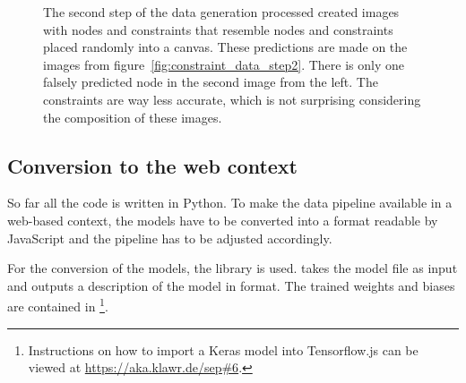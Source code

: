\begin{figure}
\begin{subfigure}[b]{0.19\textwidth}
    \end{subfigure}
    \begin{subfigure}[b]{0.19\textwidth}
    \end{subfigure}
    \caption[Predictions of the first prototype on the generated data]{The second step of the data generation processed created images with nodes and constraints that resemble nodes and constraints placed randomly into a canvas. These predictions are made on the images from figure~\ref{fig:constraint_data_step2}. There is only one falsely predicted node in the second image from the left. The constraints are way less accurate, which is not surprising considering the composition of these images.}\label{fig:constraint_data_step3}
\end{figure}

\subsection{Conversion to the web context}\label{ch:conversion_to_web_context}

So far all the code is written in Python.
To make the data pipeline available in a web-based context, the models have to be converted into a format readable by JavaScript and the pipeline has to be adjusted accordingly.

For the conversion of the models, the library  %
is used.
 takes the model file as input and outputs a description of the model in  format.
The trained weights and biases are contained in \footnote{Instructions on how to import a Keras model into Tensorflow.js can be viewed at \url{https://aka.klawr.de/sep\#6}.}. %


